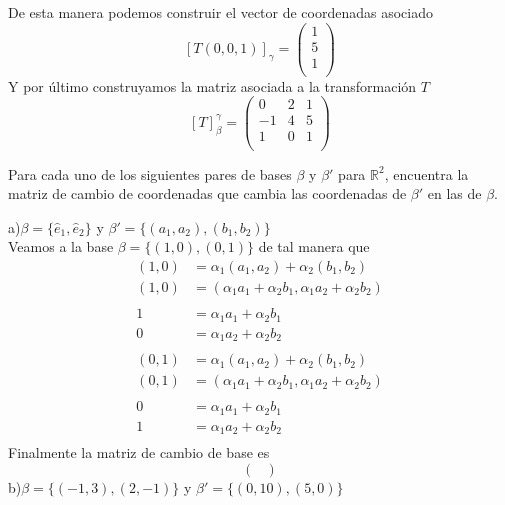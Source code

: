 \documentclass[letterpaper]{article}
\renewcommand{\*}{\cdot}
\theoremstyle{definition}
\begin{document}
		De esta manera podemos construir el vector de coordenadas asociado
		\[ [T(0,0,1)]_{\gamma} = \begin{pmatrix}
		1\\
		5\\
		1\\
		\end{pmatrix}  \]
		Y por último construyamos la matriz asociada a la transformación $ T $
		\[ [T]_{\beta}^{\gamma} = \begin{pmatrix}
		0 & 2 & 1\\
		-1 & 4 & 5\\
		1 & 0 & 1\\
		\end{pmatrix} \]	
	\begin{ejercicio}{12}
		Para cada uno de los siguientes pares de bases $\beta$ y $\beta'$ para $\mathbb{R}^{2}$, encuentra la matriz de cambio de coordenadas que cambia las coordenadas de $\beta'$ en las de $\beta$.
	\end{ejercicio}
	\noindent a)$\beta = \lbrace \hat{e}_{1},\hat{e}_{2} \rbrace$ y $\beta' = \lbrace (a_{1},a_{2}),(b_{1},b_{2}) \rbrace$\\
	Veamos a la base $ \beta = \lbrace (1,0),(0,1) \rbrace $ de tal manera que 
	\begin{align*}
		(1,0) &= \alpha_1 (a_1, a_2) + \alpha_2 (b_1,b_2)\\
		(1,0) &= (\alpha_1 a_1 + \alpha_2 b_1, \alpha_1 a_2 + \alpha_2 b_2)\\
		\\
		1 &= \alpha_1 a_1 + \alpha_2 b_1\\
		0 &= \alpha_1 a_2 + \alpha_2 b_2\\
	\end{align*}
	\begin{align*}
		(0,1) &= \alpha_1 (a_1, a_2) + \alpha_2 (b_1,b_2)\\
		(0,1) &= (\alpha_1 a_1 + \alpha_2 b_1, \alpha_1 a_2 + \alpha_2 b_2)\\
		\\
		0 &= \alpha_1 a_1 + \alpha_2 b_1\\
		1 &= \alpha_1 a_2 + \alpha_2 b_2\\
	\end{align*}
	Finalmente la matriz de cambio de base es
	\[\begin{pmatrix}
	\end{pmatrix} \]
	b)$\beta = \lbrace (-1,3),(2,-1) \rbrace$ y $\beta' = \lbrace (0,10),(5,0) \rbrace$\\
\end{document}
